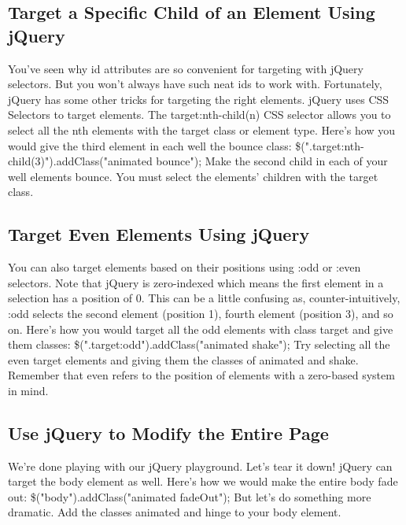 \documentclass{article}%
\begin{document}
\subsection{Target a Specific Child of an Element Using jQuery}%
\label{subsec:TargetaSpecificChildofanElementUsingjQuery}%
You've seen why id attributes are so convenient for targeting with jQuery selectors. But you won't always have such neat ids to work with.\newline%
Fortunately, jQuery has some other tricks for targeting the right elements.\newline%
jQuery uses CSS Selectors to target elements. The target:nth{-}child(n) CSS selector allows you to select all the nth elements with the target class or element type.\newline%
Here's how you would give the third element in each well the bounce class:\newline%
\$(".target:nth{-}child(3)").addClass("animated bounce");\newline%
Make the second child in each of your well elements bounce. You must select the elements' children with the target class.\newline%

%
\subsection{Target Even Elements Using jQuery}%
\label{subsec:TargetEvenElementsUsingjQuery}%
You can also target elements based on their positions using :odd or :even selectors.\newline%
Note that jQuery is zero{-}indexed which means the first element in a selection has a position of 0. This can be a little confusing as, counter{-}intuitively, :odd selects the second element (position 1), fourth element (position 3), and so on.\newline%
Here's how you would target all the odd elements with class target and give them classes:\newline%
\$(".target:odd").addClass("animated shake");\newline%
Try selecting all the even target elements and giving them the classes of animated and shake. Remember that even refers to the position of elements with a zero{-}based system in mind.\newline%

%
\subsection{Use jQuery to Modify the Entire Page}%
\label{subsec:UsejQuerytoModifytheEntirePage}%
We're done playing with our jQuery playground. Let's tear it down!\newline%
jQuery can target the body element as well.\newline%
Here's how we would make the entire body fade out:  \$("body").addClass("animated fadeOut");\newline%
But let's do something more dramatic. Add the classes animated and hinge to your body element.\newline%
\end{document}
